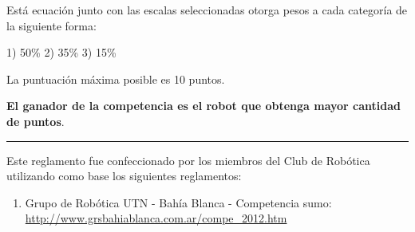 \documentclass[a4paper,11pt]{article}
\begin{document}
Está ecuación junto con las escalas seleccionadas otorga pesos a cada categoría de la siguiente forma:

1) 50\%  2) 35\%  3) 15\%

La puntuación máxima posible es 10 puntos.

\textbf{El ganador de la competencia es el robot que obtenga mayor cantidad de puntos}.

\noindent\rule{\textwidth}{0.4pt}

Este reglamento fue confeccionado por los miembros del Club de Robótica utilizando como base los siguientes reglamentos:
\begin{enumerate}
  \item Grupo de Robótica UTN - Bahía Blanca - Competencia sumo: \\
        \url{http://www.grsbahiablanca.com.ar/compe_2012.htm}
\end{enumerate}
\end{document}
